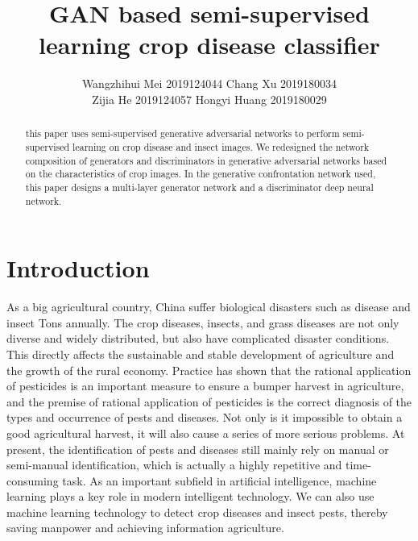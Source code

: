 \documentclass[11pt,en]{elegantpaper}
\title{GAN based semi-supervised learning crop disease classifier}
\author{Wangzhihui Mei 2019124044 Chang Xu 2019180034 \\ Zijia He 2019124057 Hongyi Huang 2019180029}
\institute{CCNU-UOW JI}
\date{}
\begin{document}
\maketitle

\begin{abstract}
	this paper uses semi-supervised generative adversarial networks to perform semi-supervised learning on crop disease and insect images. We redesigned the network composition of generators and discriminators in generative adversarial networks based on the characteristics of crop images. In the generative confrontation network used, this paper designs a multi-layer generator network and a discriminator deep neural network.
\end{abstract}

\section{Introduction}

As a big agricultural country, China suffer biological disasters such as disease and insect Tons annually. The crop diseases, insects, and grass diseases are not only diverse and widely distributed, but also have complicated disaster conditions\cite{hsu2019food}. This directly affects the sustainable and stable development of agriculture and the growth of the rural economy. Practice has shown that the rational application of pesticides is an important measure to ensure a bumper harvest in agriculture, and the premise of rational application of pesticides is the correct diagnosis of the types and occurrence of pests and diseases. Not only is it impossible to obtain a good agricultural harvest, it will also cause a series of more serious problems. At present, the identification of pests and diseases still mainly rely on manual or semi-manual identification, which is actually a highly repetitive and time-consuming task. As an important subfield in artificial intelligence, machine learning plays a key role in modern intelligent technology. We can also use machine learning technology to detect crop diseases and insect pests, thereby saving manpower and achieving information agriculture\cite{mahlein2016plant}.
\end{document}
